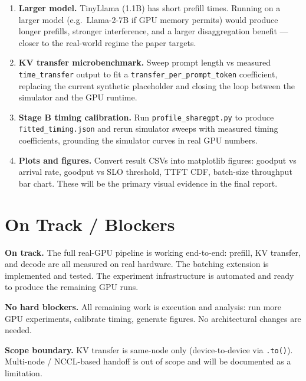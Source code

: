 \documentclass[11pt,letterpaper]{article}
\begin{document}
\begin{enumerate}[noitemsep,topsep=3pt]
  \item \textbf{Larger model.}
  TinyLlama (1.1B) has short prefill times. Running on a larger model
  (e.g.\ Llama-2-7B if GPU memory permits) would produce longer prefills,
  stronger interference, and a larger disaggregation benefit --- closer to the
  real-world regime the paper targets.

  \item \textbf{KV transfer microbenchmark.}
  Sweep prompt length vs measured \texttt{time\_transfer} output to fit a
  \texttt{transfer\_per\_prompt\_token} coefficient, replacing the current
  synthetic placeholder and closing the loop between the simulator and the GPU
  runtime.

  \item \textbf{Stage B timing calibration.}
  Run \texttt{profile\_sharegpt.py} to produce \texttt{fitted\_timing.json}
  and rerun simulator sweeps with measured timing coefficients, grounding the
  simulator curves in real GPU numbers.

  \item \textbf{Plots and figures.}
  Convert result CSVs into matplotlib figures: goodput vs arrival rate,
  goodput vs SLO threshold, TTFT CDF, batch-size throughput bar chart.
  These will be the primary visual evidence in the final report.

\end{enumerate}

\section{On Track / Blockers}

\textbf{On track.} The full real-GPU pipeline is working end-to-end: prefill,
KV transfer, and decode are all measured on real hardware. The batching extension
is implemented and tested. The experiment infrastructure is automated and ready
to produce the remaining GPU runs.

\textbf{No hard blockers.} All remaining work is execution and analysis: run more
GPU experiments, calibrate timing, generate figures. No architectural changes are
needed.

\textbf{Scope boundary.} KV transfer is same-node only (device-to-device via
\texttt{.to()}). Multi-node / NCCL-based handoff is out of scope and will be
documented as a limitation.
\end{document}
